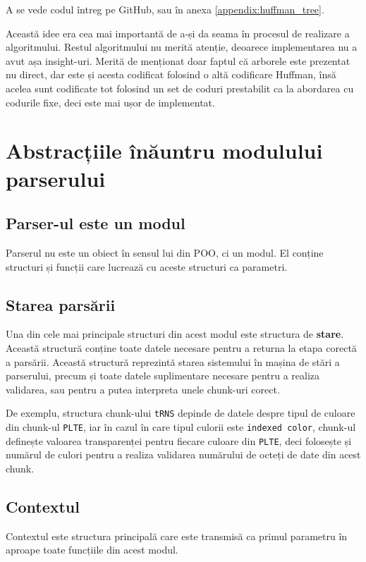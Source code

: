 \documentclass[a4paper,12pt]{report}
\begin{document}
A se vede codul întreg pe GitHub, sau în anexa \ref{appendix:huffman_tree}.

Această idee era cea mai importantă de a-și da seama în procesul de realizare a algoritmului.
Restul algoritmului nu merită atenție, deoarece implementarea nu a avut așa insight-uri.
Merită de menționat doar faptul că arborele este prezentat nu direct,
dar este și acesta codificat folosind o altă codificare Huffman,
însă acelea sunt codificate tot folosind un set de coduri prestabilit
ca la abordarea cu codurile fixe, deci este mai ușor de implementat.


\section{Abstracțiile înăuntru modulului parserului}

\subsection{Parser-ul este un modul}

Parserul nu este un obiect în sensul lui din \ac{POO}, ci un modul.
El conține structuri și funcții care lucrează cu aceste structuri ca parametri.

\subsection{Starea parsării}

Una din cele mai principale structuri din acest modul este structura de \textbf{stare}.
Această structură conține toate datele necesare pentru a returna la etapa corectă a parsării.
Această structură reprezintă starea sistemului în mașina de stări a parserului,
precum și toate datele suplimentare necesare pentru a realiza validarea,
sau pentru a putea interpreta unele chunk-uri corect.

De exemplu, structura chunk-ului \texttt{tRNS} depinde de datele despre
tipul de culoare din chunk-ul \texttt{PLTE}, iar în cazul în care tipul culorii este \texttt{indexed color},
chunk-ul definește valoarea transparenței pentru fiecare culoare din \texttt{PLTE},
deci folosește și numărul de culori pentru a realiza validarea numărului de octeți de date din acest chunk.

\subsection{Contextul}

Contextul este structura principală care este transmisă ca primul parametru
în aproape toate funcțiile din acest modul.
\end{document}
